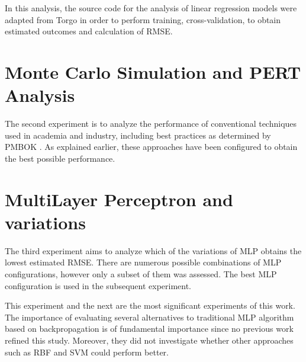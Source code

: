 In this analysis, the source code for the analysis of linear regression models were adapted from Torgo \cite{torgo2003data} in order to perform training, cross-validation, to obtain estimated outcomes and calculation of RMSE.

\section{Monte Carlo Simulation and PERT Analysis}

The second experiment is to analyze the performance of conventional techniques used in academia and industry, including best practices as determined by PMBOK \cite{PMBOK2008}. As explained earlier, these approaches have been configured to obtain the best possible performance.

\section{MultiLayer Perceptron and variations}

The third experiment aims to analyze which of the variations of MLP obtains the lowest estimated RMSE. There are numerous possible combinations of MLP configurations, however only a subset of them was assessed. The best MLP configuration is used in the subsequent experiment.

This experiment and the next are the most significant experiments of this work. The importance of evaluating several alternatives to traditional MLP algorithm based on backpropagation is of fundamental importance since no previous work refined this study. Moreover, they did not investigate whether other approaches such as RBF and SVM could perform better.

